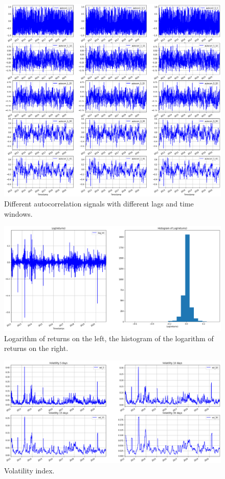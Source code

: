 \begin{figure}[H]
    \centering
    \includegraphics[width=\textwidth]{methods/images/autocorrelation.png}
    \caption{Different autocorrelation signals with different lags and time
    windows.}
    \label{fig:autocorrelation}
\end{figure}

\begin{figure}[H]
    \centering
    \includegraphics[width=\textwidth]{methods/images/log_returns.png}
    \caption{Logarithm of returns on the left, the histogram of the logarithm of returns on the right.}
    \label{fig:log_returns}
\end{figure}

\begin{figure}[H]
    \centering
    \includegraphics[width=\textwidth]{methods/images/volatility.png}
    \caption{Volatility index.}
    \label{fig:volatility}
\end{figure}